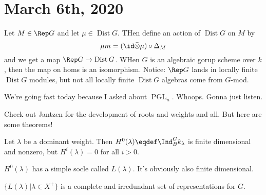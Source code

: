 \documentclass[12pt]{article}
\DeclareMathOperator{\Dist}{Dist}
\begin{document}
\section{March 6th, 2020}
Let $M\in\Rep G$ and let $\mu\in \Dist G$. THen define an action of $\Dist G$ on $M$ by 
\[\mu m=(\id\bar\otimes \mu)\circ\Delta_M\]
and we get a map $\Rep G\to\Dist G$. WHen $G$ is an algebraic gorup scheme over $k$,
then the map on homs is an isomorphism. Notice: $\Rep G$ lands in locally finite $\Dist G$ modules, 
but not all locally finite $\Dist G$ algebras come from $G$-mod.

We're going fast today because I asked about $\operatorname{PGL}_n$. Whoops. Gonna just listen.

Check out Jantzen for the development of roots and weights and all. But here are some theorems!
\begin{thm}
	Let $\lambda$ be a dominant weight. Then $H^0(\lambda)\eqdef\Ind_B^G k_\lambda$ is finite dimensional and nonzero, but $H^i(\lambda)=0$ for all $i>0$.
\end{thm}
\begin{thm}
	$H^0(\lambda)$ has a simple socle called $L(\lambda)$. It's obviously also finite dimensional.
\end{thm}
\begin{thm}
	$\{L(\lambda)|\lambda\in X^+\}$ is a complete and irredundant set of representations for $G$.
\end{thm}
\end{document}
